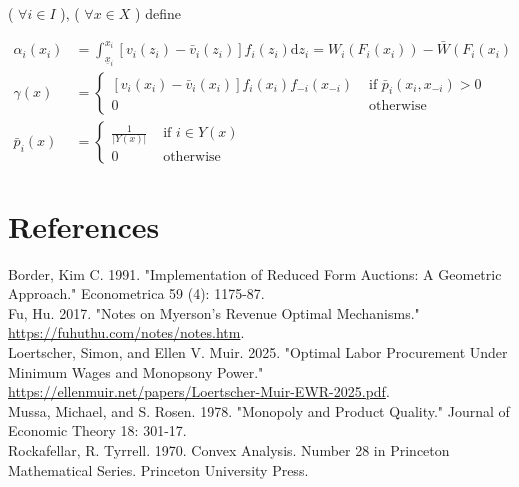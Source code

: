 \documentclass[10pt]{article}
\begin{document}
( $\forall i \in I$ ), ( $\forall x \in X$ ) define

$$
\begin{aligned}
\alpha_{i}\left(x_{i}\right) & =\int_{\underline{x}_{i}}^{x_{i}}\left[v_{i}\left(z_{i}\right)-\bar{v}_{i}\left(z_{i}\right)\right] f_{i}\left(z_{i}\right) \mathrm{d} z_{i}=W_{i}\left(F_{i}\left(x_{i}\right)\right)-\bar{W}\left(F_{i}\left(x_{i}\right)\right. \\
\gamma(x) & = \begin{cases}{\left[v_{i}\left(x_{i}\right)-\bar{v}_{i}\left(x_{i}\right)\right] f_{i}\left(x_{i}\right) f_{-i}\left(x_{-i}\right)} & \text { if } \bar{p}_{i}\left(x_{i}, x_{-i}\right)>0 \\
0 & \text { otherwise }\end{cases} \\
\bar{p}_{i}(x) & = \begin{cases}\frac{1}{|Y(x)|} & \text { if } i \in Y(x) \\
0 & \text { otherwise }\end{cases}
\end{aligned}
$$

\section*{References}
Border, Kim C. 1991. "Implementation of Reduced Form Auctions: A Geometric Approach." Econometrica 59 (4): 1175-87.\\
Fu, Hu. 2017. "Notes on Myerson's Revenue Optimal Mechanisms."\\
\href{https://fuhuthu.com/notes/notes.htm}{https://fuhuthu.com/notes/notes.htm}.\\
Loertscher, Simon, and Ellen V. Muir. 2025. "Optimal Labor Procurement Under Minimum Wages and Monopsony Power." \href{https://ellenmuir.net/papers/Loertscher-Muir-EWR-2025.pdf}{https://ellenmuir.net/papers/Loertscher-Muir-EWR-2025.pdf}.\\
Mussa, Michael, and S. Rosen. 1978. "Monopoly and Product Quality." Journal of Economic Theory 18: 301-17.\\
Rockafellar, R. Tyrrell. 1970. Convex Analysis. Number 28 in Princeton Mathematical Series. Princeton University Press.
\end{document}
